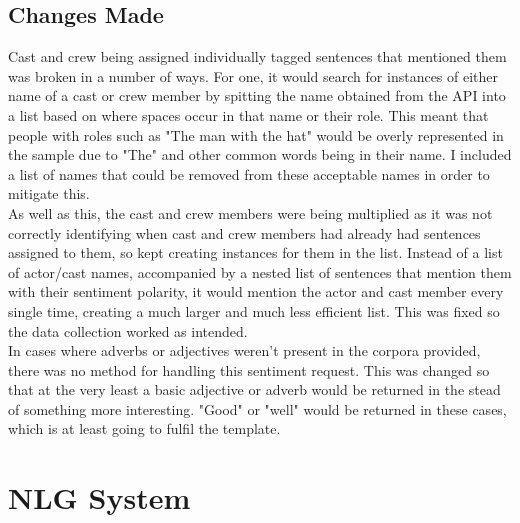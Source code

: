 \subsection{Changes Made}
Cast and crew being assigned individually tagged sentences that mentioned them was broken in a number of ways. For one, it would search for instances of either  name of a cast or crew member by spitting the name obtained from the API into a list based on where spaces occur in that name or their role. This meant that people with roles such as "The man with the hat" would be overly represented in the sample due to "The" and other common words being in their name. I included a list of names that could be removed from these acceptable names in order to mitigate this.\\
As well as this, the cast and crew members were being multiplied as it was not correctly identifying when cast and crew members had already had sentences assigned to them, so kept creating instances for them in the list. Instead of a list of actor/cast names, accompanied by a nested list of sentences that mention them with their sentiment polarity, it would mention the actor and cast member every single time, creating a much larger and much less efficient list. This was fixed so the data collection worked as intended.\\
In cases where adverbs or adjectives weren't present in the corpora provided, there was no method for handling this sentiment request. This was changed so that at the very least a basic adjective or adverb would be returned in the stead of something more interesting. "Good" or "well" would be returned in these cases, which is at least going to fulfil the template.



\section{NLG System}
